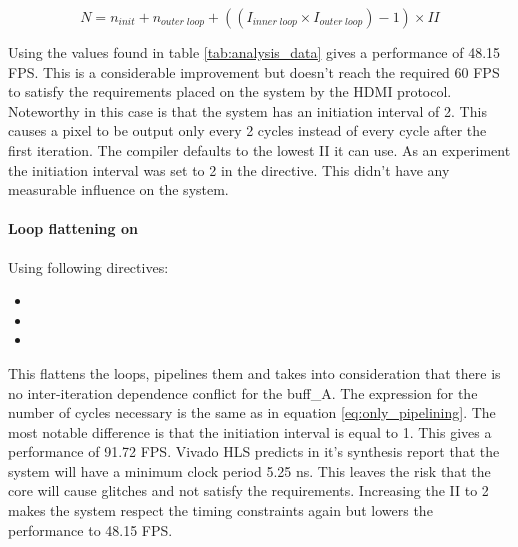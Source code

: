 \begin{equation} \label{eq:only_pipelining}
N  = n_{init} + n_{outer\;loop} + ((I_{inner\;loop} \times I_{outer\;loop}) - 1) \times II
\end{equation}

\bigskip

Using the values found in table \ref{tab:analysis_data} gives a performance of 48.15 FPS. This is a considerable improvement but doesn't reach the required 60 FPS to satisfy the requirements placed on the system by the HDMI protocol. Noteworthy in this case is that the system has an initiation interval of 2. This causes a pixel to be output only every 2 cycles instead of every cycle after the first iteration. The compiler defaults to the lowest II it can use. As an experiment the initiation interval was set to 2 in the directive. This didn't have any measurable influence on the system.

\paragraph{Loop flattening on}
Using following directives:

\begin{itemize}
\item {}
\item {}
\item {}
\end{itemize}

This flattens the loops, pipelines them and takes into consideration that there is no inter-iteration dependence conflict for the buff\_A. The expression for the number of cycles necessary is the same as in equation \ref{eq:only_pipelining}. The most notable difference is that the initiation interval is equal to 1. This gives a performance of 91.72 FPS. Vivado HLS predicts in it's synthesis report that the system will have a minimum clock period 5.25 ns. This leaves the risk that the core will cause glitches and not satisfy the requirements. Increasing the II to 2 makes the system respect the timing constraints again but lowers the performance to 48.15 FPS. 

